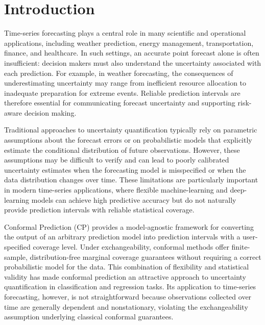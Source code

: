 \section{Introduction}

Time-series forecasting plays a central role in many scientific and operational applications, including weather prediction, energy management, transportation, finance, and healthcare. In such settings, an accurate point forecast alone is often insufficient: decision makers must also understand the uncertainty associated with each prediction. For example, in weather forecasting, the consequences of underestimating uncertainty may range from inefficient resource allocation to inadequate preparation for extreme events. Reliable prediction intervals are therefore essential for communicating forecast uncertainty and supporting risk-aware decision making.

Traditional approaches to uncertainty quantification typically rely on parametric assumptions about the forecast errors or on probabilistic models that explicitly estimate the conditional distribution of future observations. However, these assumptions may be difficult to verify and can lead to poorly calibrated uncertainty estimates when the forecasting model is misspecified or when the data distribution changes over time. These limitations are particularly important in modern time-series applications, where flexible machine-learning and deep-learning models can achieve high predictive accuracy but do not naturally provide prediction intervals with reliable statistical coverage.

Conformal Prediction (CP) \cite{vovk2005conformal} provides a model-agnostic framework for converting the output of an arbitrary prediction model into prediction intervals with a user-specified coverage level. Under exchangeability, conformal methods offer finite-sample, distribution-free marginal coverage guarantees without requiring a correct probabilistic model for the data. This combination of flexibility and statistical validity has made conformal prediction an attractive approach to uncertainty quantification in classification and regression tasks. Its application to time-series forecasting, however, is not straightforward because observations collected over time are generally dependent and nonstationary, violating the exchangeability assumption underlying classical conformal guarantees.



